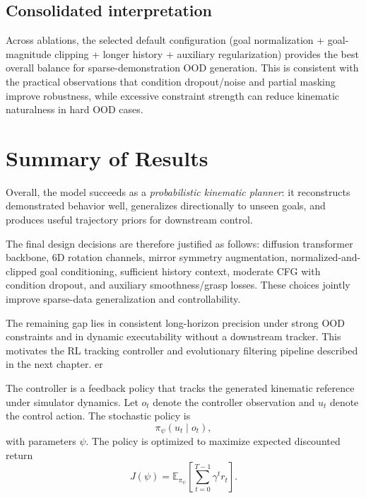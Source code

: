 \begin{itemize}
{\subsection{Consolidated interpretation}

Across ablations, the selected default configuration (goal normalization + goal-magnitude clipping + longer history + auxiliary regularization) provides the best overall balance for sparse-demonstration OOD generation. This is consistent with the practical observations that condition dropout/noise and partial masking improve robustness, while excessive constraint strength can reduce kinematic naturalness in hard OOD cases.

\section{Summary of Results}

Overall, the model succeeds as a \emph{probabilistic kinematic planner}: it reconstructs demonstrated behavior well, generalizes directionally to unseen goals, and produces useful trajectory priors for downstream control.

The final design decisions are therefore justified as follows: diffusion transformer backbone, 6D rotation channels, mirror symmetry augmentation, normalized-and-clipped goal conditioning, sufficient history context, moderate CFG with condition dropout, and auxiliary smoothness/grasp losses. These choices jointly improve sparse-data generalization and controllability.

The remaining gap lies in consistent long-horizon precision under strong OOD constraints and in dynamic executability without a downstream tracker. This motivates the RL tracking controller and evolutionary filtering pipeline described in the next chapter.
er}
\label{sec:rl_tracker}

The controller is a feedback policy that tracks the generated kinematic reference under simulator dynamics. Let $o_t$ denote the controller observation and $u_t$ denote the control action. The stochastic policy is
\begin{equation}
\pi_\psi(u_t \mid o_t),
\end{equation}
with parameters $\psi$. The policy is optimized to maximize expected discounted return
\begin{equation}
J(\psi)=\mathbb{E}_{\pi_\psi}\!\left[\sum_{t=0}^{T-1}\gamma^t r_t\right].
\label{eq:ppo_obj_generic}
\end{equation}


\end{itemize}

